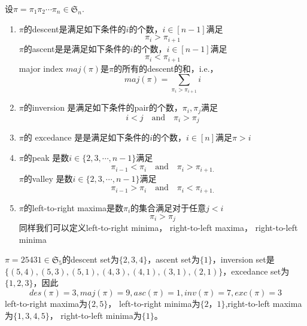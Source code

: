\begin{definition}
	设$\pi = \pi_1\pi_2\cdots \pi_n\in\mathfrak S_n$.
	\begin{enumerate}
		\item $\pi$的descent是满足如下条件的$i$的个数，$i\in [n-1]$满足
		\begin{equation*}
			\pi_i > \pi_{i+1}
		\end{equation*}
		$\pi$的ascent是是满足如下条件的$i$的个数，$i\in [n-1]$满足
		\begin{equation*}
			\pi_i < \pi_{i+1}
		\end{equation*}
		major index $maj(\pi)$是$\pi$的所有的descent的和，i.e.，
		\begin{equation*}
			maj(\pi) = \sum\limits_{\pi_i>\pi_{i+1}}i
		\end{equation*}
		\item $\pi$的inversion 是满足如下条件的pair的个数，$\pi_i, \pi_j$满足
		\begin{equation*}
			i < j\quad\text{and}\quad \pi_i>\pi_j
		\end{equation*}
		\item $\pi$的 excedance 是是满足如下条件的$i$的个数，$i\in [n]$满足$\pi > i$
		\item $\pi$的peak 是数$i\in \{2,3,\cdots, n-1\}$满足
		\begin{equation*}
			\pi_{i-1}<\pi_i\quad\text{and}\quad \pi_i>\pi_{i+1.}
		\end{equation*}
		$\pi$的valley 是数$i\in \{2,3,\cdots, n-1\}$满足
		\begin{equation*}
			\pi_{i-1}>\pi_i\quad\text{and}\quad \pi_i<\pi_{i+1.}
		\end{equation*}
		\item $\pi$的left-to-right  maxima是数$\pi_i$的集合满足对于任意$j<i$
		\begin{equation*}
				\pi_i>\pi_j
		\end{equation*}
		同样我们可以定义left-to-right  minima， right-to-left  maxima， right-to-left  minima
	\end{enumerate}
\end{definition}
\begin{example}
	$\pi = 25431\in \mathfrak S_5$的descent set为$\{2, 3, 4\}$，ascent set为$\{1\}$，inversion set是$\{(5,4),(5, 3), (5, 1),(4,3), (4,1), (3, 1),(2, 1)\}$，excedance set为$\{1, 2, 3\}$，因此
	\begin{equation*}
		des(\pi) = 3,maj(\pi) = 9,asc(\pi) = 1, inv(\pi) = 7, exc(\pi) = 3
	\end{equation*}
	left-to-right maxima为$\{2, 5\}$， left-to-right minima为$\{2， 1\}$,right-to-left maxima为$\{1, 3, 4, 5\}$， right-to-left minima为$\{1\}$。
\end{example}

